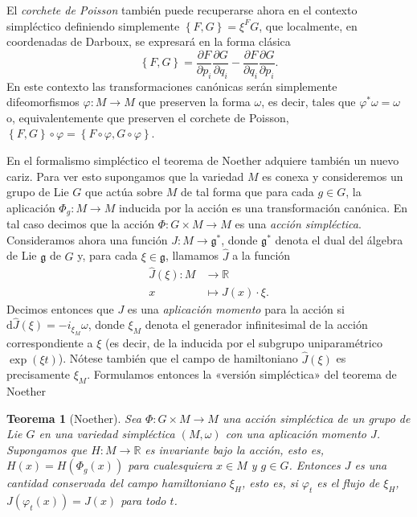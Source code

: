 \documentclass[12pt,a4paper,twoside]{article}
\newtheorem{thm}{Teorema}[section]
\theoremstyle{definition} \newtheorem{defn}[thm]{Definición}
\theoremstyle{definition} \newtheorem{ejemplo}[thm]{Ejemplo}
\theoremstyle{definition} \newtheorem{ejercicio}[thm]{Ejercicio}
\theoremstyle{remark} \newtheorem*{obs}{Observación}
\def\RR{\mathbb{R}}
\def\dd{\mathrm{d}}
\def\gg{\mathfrak{g}}
\newcommand{\parcial}[2]{\frac{\partial #1}{\partial #2}}
\begin{document}
El  \emph{corchete de Poisson} también puede recuperarse ahora en el contexto simpléctico definiendo simplemente $\left\{ F,G \right\}=\xi^F G$, que localmente, en coordenadas de Darboux, se expresará en la forma clásica
\begin{equation}
  \left\{ F,G \right\}=\parcial{F}{p_i}\parcial{G}{q_i}-\parcial{F}{q_i}\parcial{G}{p_i}.
  \label{eq:poisson}
\end{equation}
En este contexto las transformaciones canónicas serán simplemente difeomorfismos $\varphi:M\rightarrow M$ que preserven la forma $\omega$, es decir, tales que $\varphi^*\omega=\omega$ o, equivalentemente que preserven el corchete de Poisson, $\left\{ F,G \right\}\circ \varphi=\left\{ F\circ \varphi,G\circ \varphi \right\}$.

En el formalismo simpléctico el teorema de Noether adquiere también un nuevo cariz. Para ver esto supongamos que la variedad $M$ es conexa y consideremos un grupo de Lie $G$ que actúa sobre $M$ de tal forma que para cada $g\in G$, la aplicación $\Phi_g:M\rightarrow M$ inducida por la acción es una transformación canónica. En tal caso decimos que la acción $\Phi:G\times M\rightarrow M$ es una \emph{acción simpléctica}. Consideramos ahora una función $J:M\rightarrow \gg^*$, donde $\gg^*$ denota el dual del álgebra de Lie $\gg$ de $G$ y, para cada $\xi\in \gg$, llamamos $\hat{J}$ a la función
\begin{align*}
  \hat{J}(\xi) :M&\longrightarrow \RR\\ 
     x &\longmapsto J(x)\cdot \xi.
  \end{align*}
  Decimos entonces que $J$ es una \emph{aplicación momento} para la acción si $\dd \hat{J}(\xi)=-i_{\xi_M}\omega$, donde $\xi_M$ denota el generador infinitesimal de la acción correspondiente a $\xi$ (es decir, de la inducida por el subgrupo uniparamétrico $\exp(\xi t)$). Nótese también que el campo de hamiltoniano $\hat{J}(\xi)$ es precisamente $\xi_M$. Formulamos entonces la «versión simpléctica» del teorema de Noether 
  \begin{thm}[Noether]
    Sea $\Phi:G\times M \rightarrow M$ una acción simpléctica de un grupo de Lie $G$ en una variedad simpléctica $(M,\omega)$ con una aplicación momento $J$. Supongamos que $H:M\rightarrow \RR$ es invariante bajo la acción, esto es, $H(x)=H(\Phi_g(x))$ para cualesquiera $x\in M$ y $g\in G$. Entonces $J$ es una cantidad conservada del campo hamiltoniano $\xi_H$, esto es, si $\varphi_t$ es el flujo de $\xi_H$, $J(\varphi_t(x))=J(x)$ para todo $t$.
  \end{thm}
\end{document}
